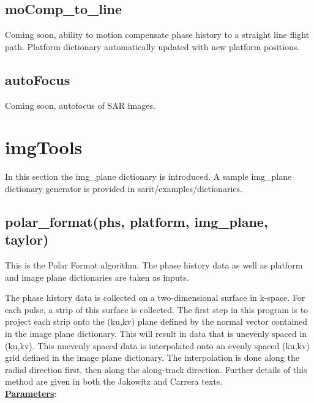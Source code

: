 \documentclass{article}
\begin{document}
\subsection{moComp\_to\_line} Coming soon, ability to motion compensate phase history to a straight line flight path.  Platform dictionary automatically updated with new platform positions.

\subsection{autoFocus}  Coming soon, autofocus of SAR images.

\newpage

\section{imgTools}
In this section the img\_plane dictionary is introduced.  A sample img\_plane dictionary generator is provided in sarit/examples/dictionaries.

\subsection{polar\_format(phs, platform, img\_plane, taylor)}
This is the Polar Format algorithm.  The phase history data as well as platform and image plane dictionaries are taken as inputs. 

The phase history data is collected on a two-dimensional surface in k-space.  For each pulse, a strip of this surface is collected.  The first step in this program is to project each strip onto the (ku,kv) plane defined by the normal vector contained in the image plane dictionary.  This will result in data that is unevenly spaced in (ku,kv). This unevenly spaced data is interpolated onto an evenly spaced (ku,kv) grid defined in the image plane dictionary.  The interpolation is done along the radial direction first, then along the along-track direction.  Further details of this method are given in both the Jakowitz and Carrera texts.\\

\noindent \underline{\textbf{Parameters}}:
\end{document}

